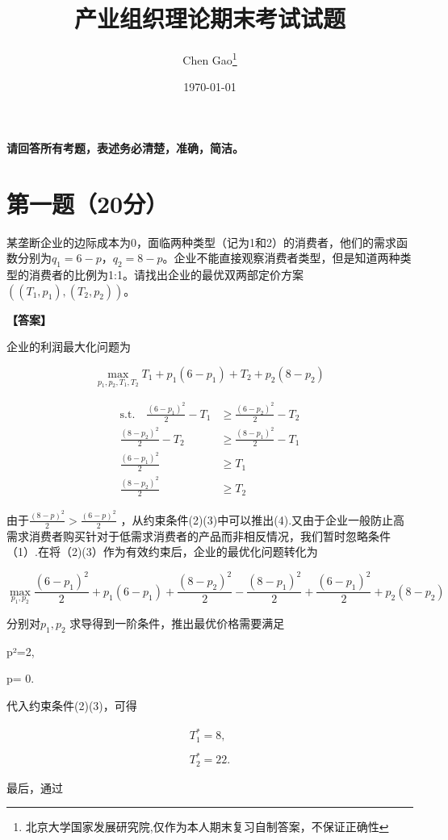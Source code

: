 \documentclass[12pt]{article}
\begin{document}
\title{产业组织理论期末考试试题}
\author{Chen Gao\thanks{北京大学国家发展研究院,仅作为本人期末复习自制答案，不保证正确性}}
\date{\today}
\maketitle

\medskip
\noindent\textbf{请回答所有考题，表述务必清楚，准确，简洁。}

\section*{第一题（20分）}
某垄断企业的边际成本为0，面临两种类型（记为1和2）的消费者，他们的需求函数分别为$q_1=6-p$，$q_2=8-p$。企业不能直接观察消费者类型，但是知道两种类型的消费者的比例为1:1。请找出企业的最优双两部定价方案$((T_1,p_1),(T_2,p_2))$。

\noindent\textbf{【答案】}

企业的利润最大化问题为

$$\max\limits_{p_1,p_2,T_1,T_2}T_1+p_1(6-p_1)+T_2+p_2(8-p_2)$$

$$\begin{aligned}
\mathrm{s.t.}\quad{\frac{(6-p_{1})^{2}}{2}}-T_{1}& \geq\frac{(6-p_{2})^{2}}{2}-T_{2} \\
\frac{(8-p_{2})^{2}}{2}-T_{2}& \geq\frac{(8-p_{1})^{2}}{2}-T_{1} \\
\frac{(6-p_{1})^{2}}{2}& \geq T_{1} \\
\frac{(8-p_{2})^{2}}{2}& \geq T_{2} 
\end{aligned}$$

由于$\frac{(8-p)^2}2>\frac{(6-p)^2}2$ ，从约束条件(2)(3)中可以推出(4).又由于企业一般防止高需求消费者购买针对于低需求消费者的产品而非相反情况，我们暂时忽略条件（1）.在将（2)(3）作为有效约束后，企业的最优化问题转化为

$$\max\limits_{p_1,p_2}\frac{(6-p_1)^2}{2}+p_1(6-p_1)+\frac{(8-p_2)^2}{2}-\frac{(8-p_1)^2}{2}+\frac{(6-p_1)^2}{2}+p_2(8-p_2)$$

分别对$p_{1},p_{2}$ 求导得到一阶条件，推出最优价格需要满足

p²=2,

p= 0.

代入约束条件(2)(3)，可得

$$\begin{array}{c}T_1^*=8,\\\\T_2^*=22.\end{array}$$

最后，通过
\end{document}
